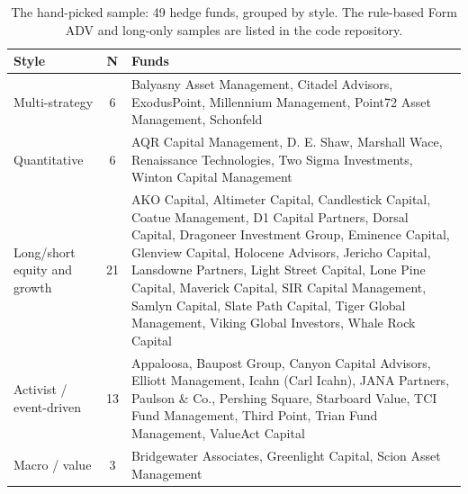 \begin{table}[t]
  \caption{The hand-picked sample: 49 hedge funds, grouped by style. The rule-based Form ADV and long-only samples are listed in the code repository.}
  \label{tab:funds}
  \small
  \begin{tabular}{p{3.6cm}cp{12.4cm}}
    \toprule
    Style & N & Funds \\
    \midrule
    Multi-strategy & 6 & Balyasny Asset Management, Citadel Advisors, ExodusPoint, Millennium Management, Point72 Asset Management, Schonfeld \\
    Quantitative & 6 & AQR Capital Management, D. E. Shaw, Marshall Wace, Renaissance Technologies, Two Sigma Investments, Winton Capital Management \\
    Long/short equity and growth & 21 & AKO Capital, Altimeter Capital, Candlestick Capital, Coatue Management, D1 Capital Partners, Dorsal Capital, Dragoneer Investment Group, Eminence Capital, Glenview Capital, Holocene Advisors, Jericho Capital, Lansdowne Partners, Light Street Capital, Lone Pine Capital, Maverick Capital, SIR Capital Management, Samlyn Capital, Slate Path Capital, Tiger Global Management, Viking Global Investors, Whale Rock Capital \\
    Activist / event-driven & 13 & Appaloosa, Baupost Group, Canyon Capital Advisors, Elliott Management, Icahn (Carl Icahn), JANA Partners, Paulson \& Co., Pershing Square, Starboard Value, TCI Fund Management, Third Point, Trian Fund Management, ValueAct Capital \\
    Macro / value & 3 & Bridgewater Associates, Greenlight Capital, Scion Asset Management \\
    \bottomrule
  \end{tabular}
\end{table}
